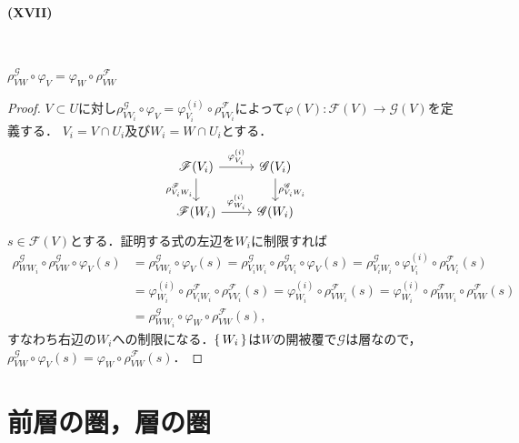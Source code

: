 \paragraph{(XVII)}~
\begin{screen}
  $\rho_{VW}^\mathscr{G} \circ \varphi_V = \varphi_W \circ \rho_{VW}^\mathscr{F}$
\end{screen}
\begin{proof}
  $V \subset U$に対し$\rho_{VV_i}^\mathscr{G} \circ \varphi_V = \varphi_{V_i}^{(i)} \circ \rho_{VV_i}^\mathscr{F}$によって$\varphi(V) \colon \mathscr{F}(V) \to \mathscr{G}(V)$を定義する．
  $V_i = V \cap U_i$及び$W_i = W \cap U_i$とする．
  \[
  \begin{tikzcd}
    \mathscr{F}(V_i) \arrow[r, "\varphi_{V_i}^{(i)}"]\arrow[d, "\rho_{V_iW_i}^\mathscr{F}"'] & \mathscr{G}(V_i)\arrow[d, "\rho_{V_iW_i}^\mathscr{G}"] \\
    \mathscr{F}(W_i) \arrow[r, "\varphi_{W_i}^{(i)}"] & \mathscr{G}(W_i)
  \end{tikzcd}
  \]
  $s \in \mathscr{F}(V)$とする．証明する式の左辺を$W_i$に制限すれば
  \begin{align*}
    \rho_{WW_i}^\mathscr{G} \circ \rho_{VW}^\mathscr{G} \circ \varphi_V(s)
    &= \rho_{VW_i}^\mathscr{G} \circ \varphi_V(s)
    = \rho_{V_iW_i}^\mathscr{G} \circ \rho_{VV_i}^\mathscr{G} \circ \varphi_V(s)
    = \rho_{V_iW_i}^\mathscr{G} \circ \varphi_{V_i}^{(i)} \circ \rho_{VV_i}^\mathscr{F}(s) \\
    & = \varphi_{W_i}^{(i)} \circ \rho_{V_iW_i}^\mathscr{F} \circ \rho_{VV_i}^\mathscr{F}(s)
    = \varphi_{W_i}^{(i)} \circ \rho_{VW_i}^\mathscr{F}(s)
    = \varphi_{W_i}^{(i)} \circ \rho_{WW_i}^\mathscr{F} \circ \rho_{VW}^\mathscr{F}(s) \\
    & = \rho_{WW_i}^\mathscr{G} \circ \varphi_W \circ \rho_{VW}^\mathscr{F}(s) ,
  \end{align*}
  すなわち右辺の$W_i$への制限になる．$\set{W_i}$は$W$の開被覆で$\mathscr{G}$は層なので，$\rho_{VW}^\mathscr{G} \circ \varphi_V(s) = \varphi_W \circ \rho_{VW}^\mathscr{F}(s)$．
\end{proof}

\section{前層の圏，層の圏}
